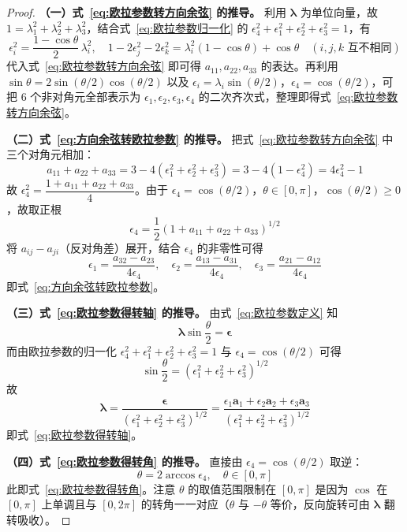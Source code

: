 \begin{proof}
\textbf{（一）式~\eqref{eq:欧拉参数转方向余弦} 的推导。}  利用 $\bm{\lambda}$ 为单位向量，故 $1=\lambda_1^2+\lambda_2^2+\lambda_3^2$，结合式~\eqref{eq:欧拉参数归一化} 的 $\epsilon_4^2+\epsilon_1^2+\epsilon_2^2+\epsilon_3^2=1$，有
$$
\epsilon_i^2=\frac{1-\cos\theta}{2}\,\lambda_i^{2},\quad 1-2\epsilon_j^2-2\epsilon_k^2=\lambda_i^2(1-\cos\theta)+\cos\theta \quad (i,j,k\text{ 互不相同})
$$
代入式~\eqref{eq:欧拉参数转方向余弦} 即可得 $a_{11},a_{22},a_{33}$ 的表达。再利用 $\sin\theta=2\sin(\theta/2)\cos(\theta/2)$ 以及 $\epsilon_i=\lambda_i\sin(\theta/2)$，$\epsilon_4=\cos(\theta/2)$，可把 6 个非对角元全部表示为 $\epsilon_1,\epsilon_2,\epsilon_3,\epsilon_4$ 的二次齐次式，整理即得式~\eqref{eq:欧拉参数转方向余弦}。

\textbf{（二）式~\eqref{eq:方向余弦转欧拉参数} 的推导。}  把式~\eqref{eq:欧拉参数转方向余弦} 中三个对角元相加：
$$
a_{11}+a_{22}+a_{33}=3-4(\epsilon_1^2+\epsilon_2^2+\epsilon_3^2)=3-4(1-\epsilon_4^2)=4\epsilon_4^2-1
$$
故 $\epsilon_4^2=\dfrac{1+a_{11}+a_{22}+a_{33}}{4}$。由于 $\epsilon_4=\cos(\theta/2)$，$\theta\in[0,\pi]$，$\cos(\theta/2)\geq 0$，故取正根
$$
\epsilon_4=\frac{1}{2}(1+a_{11}+a_{22}+a_{33})^{1/2}
$$
将 $a_{ij}-a_{ji}$（反对角差）展开，结合 $\epsilon_4$ 的非零性可得
$$
\epsilon_1=\frac{a_{32}-a_{23}}{4\epsilon_4},\quad \epsilon_2=\frac{a_{13}-a_{31}}{4\epsilon_4},\quad \epsilon_3=\frac{a_{21}-a_{12}}{4\epsilon_4}
$$
即式~\eqref{eq:方向余弦转欧拉参数}。

\textbf{（三）式~\eqref{eq:欧拉参数得转轴} 的推导。}  由式~\eqref{eq:欧拉参数定义} 知
$$
\bm{\lambda}\sin\frac{\theta}{2}=\bm{\epsilon}
$$
而由欧拉参数的归一化 $\epsilon_4^2+\epsilon_1^2+\epsilon_2^2+\epsilon_3^2=1$ 与 $\epsilon_4=\cos(\theta/2)$ 可得
$$
\sin\frac{\theta}{2}=(\epsilon_1^2+\epsilon_2^2+\epsilon_3^2)^{1/2}
$$
故
$$
\bm{\lambda}=\frac{\bm{\epsilon}}{(\epsilon_1^2+\epsilon_2^2+\epsilon_3^2)^{1/2}}=\frac{\epsilon_1\mathbf{a}_1+\epsilon_2\mathbf{a}_2+\epsilon_3\mathbf{a}_3}{(\epsilon_1^2+\epsilon_2^2+\epsilon_3^2)^{1/2}}
$$
即式~\eqref{eq:欧拉参数得转轴}。

\textbf{（四）式~\eqref{eq:欧拉参数得转角} 的推导。}  直接由 $\epsilon_4=\cos(\theta/2)$ 取逆：
$$
\theta=2\arccos\epsilon_4,\quad \theta\in[0,\pi]
$$
此即式~\eqref{eq:欧拉参数得转角}。注意 $\theta$ 的取值范围限制在 $[0,\pi]$ 是因为 $\cos$ 在 $[0,\pi]$ 上单调且与 $[0,2\pi]$ 的转角一一对应（$\theta$ 与 $-\theta$ 等价，反向旋转可由 $\bm{\lambda}$ 翻转吸收）。


\end{proof}
